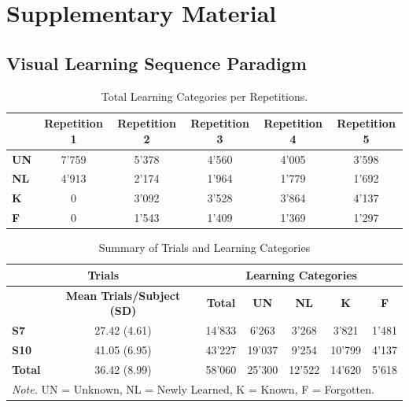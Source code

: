 \section{Supplementary Material} \label{SuppM}
\subsection*{Visual Learning Sequence Paradigm}
\begin{table}[H]
\centering
\begin{tabular}{lccccc}
\hline
            & \textbf{Repetition 1} & \textbf{Repetition 2} & \textbf{Repetition 3} & \textbf{Repetition 4} & \textbf{Repetition 5} \\ \hline
\textbf{UN} & 7'759                 & 5'378                 & 4'560                 & 4'005                 & 3'598                 \\
\textbf{NL} & 4'913                 & 2'174                 & 1'964                 & 1'779                 & 1'692                 \\
\textbf{K}  & 0                     & 3'092                 & 3'528                 & 3'864                 & 4'137                 \\
\textbf{F}  & 0                     & 1'543                 & 1'409                 & 1'369                 & 1'297                 \\ \hline
\end{tabular}
\caption[]{Total Learning Categories per Repetitions.}
\label{tab:RepLC}
\end{table}

\begin{table}[H]
\centering
\begin{tabular}{lcccccc}
\hline
\multicolumn{2}{c}{\textbf{Trials}}                & \multicolumn{5}{c}{\textbf{Learning Categories}}                     \\ \hline
               & \textbf{Mean Trials/Subject (SD)} & \textbf{Total} & \textbf{UN} & \textbf{NL} & \textbf{K} & \textbf{F} \\ \cline{2-7} 
\textbf{S7}    & 27.42 (4.61)                      & 14'833         & 6'263       & 3'268       & 3'821      & 1'481      \\
\textbf{S10}   & 41.05 (6.95)                      & 43'227         & 19'037      & 9'254       & 10'799     & 4'137      \\
\textbf{Total} & 36.42 (8.99)                      & 58'060         & 25'300      & 12'522      & 14'620     & 5'618      \\ \hline 
\multicolumn{7}{l}{\small \textit{Note.} UN = Unknown, NL = Newly Learned, K = Known, F = Forgotten.}
\end{tabular}
\caption[]{Summary of Trials and Learning Categories}
\label{tab:my_label}
\end{table}

